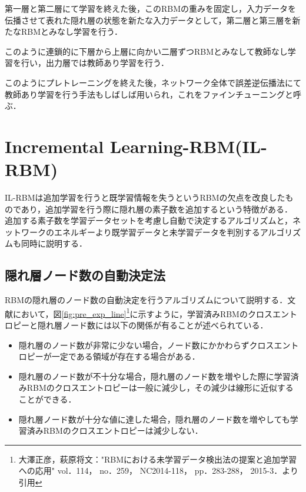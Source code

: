 第一層と第二層にて学習を終えた後，このRBMの重みを固定し，入力データを伝播させて表れた隠れ層の状態を新たな入力データとして，第二層と第三層を新たなRBMとみなし学習を行う．

このように連鎖的に下層から上層に向かい二層ずつRBMとみなして教師なし学習を行い，出力層では教師あり学習を行う．

このようにプレトレーニングを終えた後，ネットワーク全体で誤差逆伝播法にて教師あり学習を行う手法もしばしば用いられ，これをファインチューニングと呼ぶ．

\section{Incremental Learning-RBM(IL-RBM)}\label{sec:rbm}

IL-RBM\cite{osawa}は追加学習を行うと既学習情報を失うというRBMの欠点を改良したものであり，追加学習を行う際に隠れ層の素子数を追加するという特徴がある．
追加する素子数を学習データセットを考慮し自動で決定するアルゴリズムと，ネットワークのエネルギーより既学習データと未学習データを判別するアルゴリズムも同時に説明する．

\subsection{隠れ層ノード数の自動決定法}\label{sec:node}
RBMの隠れ層のノード数の自動決定を行うアルゴリズムについて説明する．文献\cite{osawa}において，図\ref{fig:pre_exp_line}\footnote{大澤正彦，萩原将文："RBMにおける未学習データ検出法の提案と追加学習への応用" vol．114， no．259， NC2014-118， pp．283-288， 2015-3．より引用}に示すように，学習済みRBMのクロスエントロピーと隠れ層ノード数には以下の関係が有ることが述べられている．

\begin{itemize}
 \item  隠れ層のノード数が非常に少ない場合，ノード数にかかわらずクロスエントロピーが一定である領域が存在する場合がある．
  \item 隠れ層のノード数が不十分な場合，隠れ層のノード数を増やした際に学習済みRBMのクロスエントロピーは一般に減少し，その減少は線形に近似することができる．
  \item 隠れ層ノード数が十分な値に達した場合，隠れ層のノード数を増やしても学習済みRBMのクロスエントロピーは減少しない． 　
\end{itemize}

